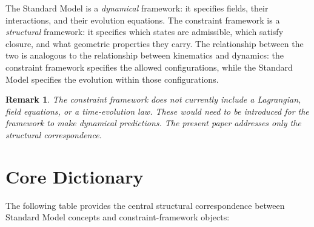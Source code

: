 \documentclass[12pt]{article}
\newtheorem{remark}{Remark}
\begin{document}
The Standard Model is a \textit{dynamical} framework: it specifies fields, their interactions, and their evolution equations. The constraint framework is a \textit{structural} framework: it specifies which states are admissible, which satisfy closure, and what geometric properties they carry. The relationship between the two is analogous to the relationship between kinematics and dynamics: the constraint framework specifies the allowed configurations, while the Standard Model specifies the evolution within those configurations.

\begin{remark}
The constraint framework does not currently include a Lagrangian, field equations, or a time-evolution law. These would need to be introduced for the framework to make dynamical predictions. The present paper addresses only the structural correspondence.
\end{remark}

\section{Core Dictionary}\label{sec:dictionary}

The following table provides the central structural correspondence between Standard Model concepts and constraint-framework objects:
\end{document}
